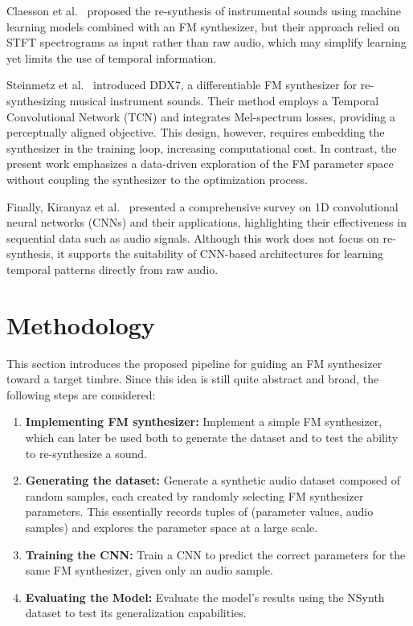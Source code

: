 \documentclass[10pt,conference]{IEEEtran}
\begin{document}
Claesson et al.~\cite{claesson2021resynthesis} proposed the re-synthesis of instrumental sounds using machine learning models combined with an FM synthesizer, but their approach relied on STFT spectrograms as input rather than raw audio, which may simplify learning yet limits the use of temporal information.

Steinmetz et al.~\cite{steinmetz2022ddx7} introduced DDX7, a differentiable FM synthesizer for re-synthesizing musical instrument sounds. Their method employs a Temporal Convolutional Network (TCN) and integrates Mel-spectrum losses, providing a perceptually aligned objective. This design, however, requires embedding the synthesizer in the training loop, increasing computational cost. In contrast, the present work emphasizes a data-driven exploration of the FM parameter space without coupling the synthesizer to the optimization process.

Finally, Kiranyaz et al.~\cite{kiranyaz2021survey} presented a comprehensive survey on 1D convolutional neural networks (CNNs) and their applications, highlighting their effectiveness in sequential data such as audio signals. Although this work does not focus on re-synthesis, it supports the suitability of CNN-based architectures for learning temporal patterns directly from raw audio.

\section{Methodology} \label{sec:our_proposal}

This section introduces the proposed pipeline for guiding an FM synthesizer toward a target timbre. Since this idea is still quite abstract and broad, the following steps are considered:

\begin{enumerate}
    \item \textbf{Implementing FM synthesizer:} Implement a simple FM synthesizer, which can later be used both to generate the dataset and to test the ability to re-synthesize a sound.
    \item \textbf{Generating the dataset:} Generate a synthetic audio dataset composed of random samples, each created by randomly selecting FM synthesizer parameters. This essentially records tuples of (parameter values, audio samples) and explores the parameter space at a large scale.
    \item \textbf{Training the CNN:} Train a CNN to predict the correct parameters for the same FM synthesizer, given only an audio sample.
    \item \textbf{Evaluating the Model:} Evaluate the model's results using the NSynth dataset to test its generalization capabilities.
\end{enumerate}
\end{document}
